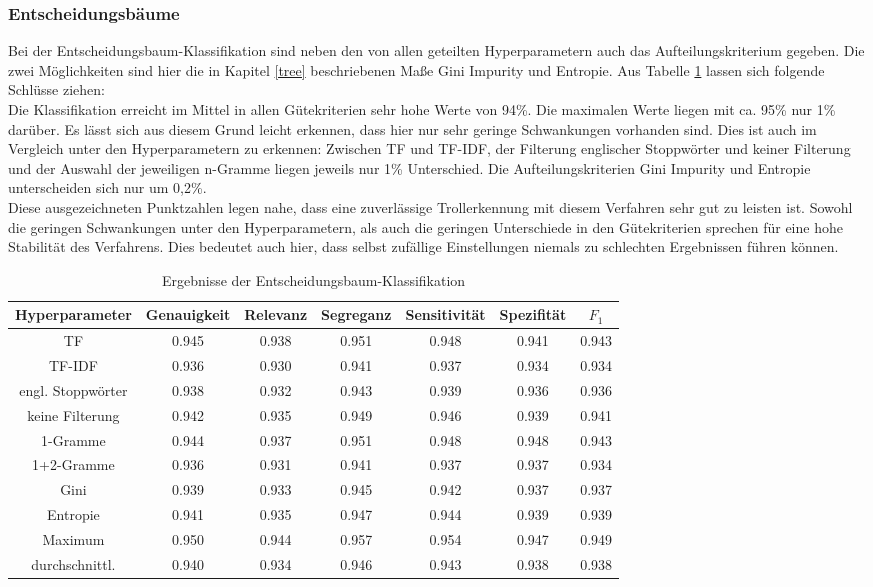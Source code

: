 \subsubsection{Entscheidungsbäume}
Bei der Entscheidungsbaum-Klassifikation sind neben den von allen geteilten Hyperparametern auch das Aufteilungskriterium gegeben. Die zwei Möglichkeiten sind hier die in Kapitel \ref{tree} beschriebenen Maße Gini Impurity und Entropie. Aus Tabelle \ref{results-tree} lassen sich folgende Schlüsse ziehen:\\
Die Klassifikation erreicht im Mittel in allen Gütekriterien sehr hohe Werte von 94\%. Die maximalen Werte liegen mit ca. 95\% nur 1\% darüber. Es lässt sich aus diesem Grund leicht erkennen, dass hier nur sehr geringe Schwankungen vorhanden sind. Dies ist auch im Vergleich unter den Hyperparametern zu erkennen: Zwischen TF und TF-IDF, der Filterung englischer Stoppwörter und keiner Filterung und der Auswahl der jeweiligen n-Gramme liegen jeweils nur 1\% Unterschied. Die Aufteilungskriterien Gini Impurity und Entropie unterscheiden sich nur um 0,2\%.\\
Diese ausgezeichneten Punktzahlen legen nahe, dass eine zuverlässige Trollerkennung mit diesem Verfahren sehr gut zu leisten ist. Sowohl die geringen Schwankungen unter den Hyperparametern, als auch die geringen Unterschiede in den Gütekriterien sprechen für eine hohe Stabilität des Verfahrens. Dies bedeutet auch hier, dass selbst zufällige Einstellungen niemals zu schlechten Ergebnissen führen können.\\
\begin{table}[htb]
	\begin{center}
		\begin{tabular}{|c|c|c|c|c|c|c|}
			\hline 
			Hyperparameter & Genauigkeit & Relevanz & Segreganz & Sensitivität & Spezifität & $F_1$ \\ \hline \hline
			TF       & 0.945 & 0.938 & 0.951 & 0.948 & 0.941 & 0.943 \\ \hline
			TF-IDF   & 0.936 & 0.930 & 0.941 & 0.937 & 0.934 & 0.934 \\ \hline \hline
			engl. Stoppwörter & 0.938 & 0.932 & 0.943 & 0.939 & 0.936 & 0.936 \\ \hline
			keine Filterung    & 0.942 & 0.935 & 0.949 & 0.946 & 0.939 & 0.941 \\ \hline \hline
			1-Gramme   & 0.944 & 0.937 & 0.951 & 0.948 & 0.948 & 0.943 \\ \hline
			1+2-Gramme  & 0.936 & 0.931 & 0.941 & 0.937 & 0.937 & 0.934 \\ \hline \hline
			Gini & 0.939 & 0.933 & 0.945 & 0.942 & 0.937 & 0.937 \\ \hline
			Entropie & 0.941 & 0.935 & 0.947 & 0.944 & 0.939 & 0.939 \\ \hline
			\hline
			Maximum        & 0.950 & 0.944 & 0.957 & 0.954 & 0.947 & 0.949 \\ \hline
			durchschnittl. & 0.940 & 0.934 & 0.946 & 0.943 & 0.938 & 0.938 \\ \hline
		\end{tabular}
		\caption{Ergebnisse der Entscheidungsbaum-Klassifikation}\label{results-tree}
	\end{center}
\end{table}\\
